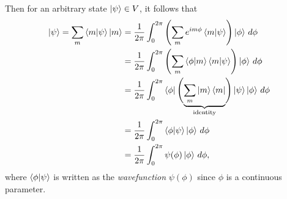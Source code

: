Then for an arbitrary state $\ket{\psi}\in V$, it follows that
\begin{align}
    \begin{split}        
    \ket{\psi} = \sum_m \braket{m|\psi}\ket{m} 
        &= \frac{1}{2\pi}\int_{0}^{2\pi} \left( \sum_m e^{im\phi}\braket{m|\psi} \right)\ket{\phi} \,d\phi \\
        &= \frac{1}{2\pi}\int_{0}^{2\pi} \left( \sum_m \braket{\phi|m}\braket{m|\psi} \right)\ket{\phi} \,d\phi \\
        &= \frac{1}{2\pi}\int_{0}^{2\pi} \bra{\phi}\Biggl( \underbrace{\sum_m \ket{m}\bra{m}}_{\textrm{identity}} \Biggr)\ket{\psi}\ket{\phi} \,d\phi \\
        &= \frac{1}{2\pi}\int_{0}^{2\pi} \braket{\phi|\psi}\ket{\phi} \,d\phi \\
        &= \frac{1}{2\pi}\int_{0}^{2\pi} \psi(\phi)\ket{\phi} \,d\phi,
    \end{split}
\end{align}
where $\braket{\phi|\psi}$ is written as the \textit{wavefunction} $\psi(\phi)$ since $\phi$ is a continuous parameter.


